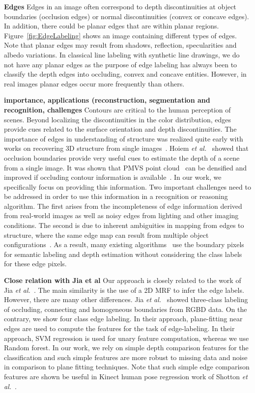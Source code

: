 \textbf{Edges}
Edges in an image often correspond to depth discontinuities at object boundaries (occlusion 
edges) or normal discontinuities (convex or concave edges). In addition, there could be 
planar edges that are within planar regions. Figure~\ref{fig:EdgeLabeling} shows an image 
containing different types of edges. Note that planar edges may result from shadows, reflection, 
specularities and albedo variations. In classical line labeling with synthetic line 
drawings, we do not have any planar edges as the purpose of edge labeling has always been to 
classify the depth edges into occluding, convex and concave entities. However, in real images planar 
edges occur more frequently than others. 

\textbf{importance, applications (reconstruction, segmentation and recognition, challenges}
Contours are critical to the human perception of scenes. Beyond localizing the discontinuities 
in the color distribution, edges provide cues related to the surface orientation and depth 
discontinuities. The importance of edges in understanding of structure was realized quite 
early with works on recovering 3D structure from single 
 images~\cite{malik1989recovering,kanade1981recovery}. Hoiem \textit{et al.}~\cite{hoiem-ROB} showed that occlusion boundaries provide very useful cues to estimate the depth of a scene from a single image. It was shown that PMVS 
point cloud~\cite{furukawa-PAMI10} can be densified and improved if occluding contour information 
is available~\cite{qishan2014Occluding}. In our work, we specifically focus on providing this
information. Two important challenges need to be addressed in order to use this information in a 
recognition or reasoning algorithm. The first arises from the incompleteness of edge information 
derived from real-world images as well as noisy edges from lighting and other imaging conditions. 
The second is due to inherent ambiguities in mapping from edges to structure, where the same 
edge map can result from multiple object configurations~\cite{mild-sugihara}. As a result, many existing 
algorithms~\cite{gcontext-hoiem,hedau2012,schwing2012b,Lifting3DManhattan,lee2010} use the boundary 
pixels for semantic labeling and depth estimation without considering the class labels for these edge pixels. 

\textbf{Close relation with Jia et al}
Our approach is closely related to the work of Jia \textit{et al.}~\cite{depthorder}. The main 
similarity is the use of a 2D MRF to infer the edge labels. However, there are many other 
differences. Jia \textit{et al.}~\cite{depthorder} showed three-class labeling of occluding, connecting and 
homogeneous boundaries from RGBD data. On the contrary, we show four class edge labeling. In their 
approach, plane-fitting near edges are used to compute the features for the task of edge-labeling. 
In their approach, SVM regression is used for unary feature computation, whereas we use Random 
forest. In our work, we rely on simple depth comparison features for the classification and such simple 
features are more robust to missing data and noise in comparison to plane fitting techniques. Note that 
such simple edge comparison features are shown be useful in Kinect human pose regression work of 
Shotton \textit{et al.}~\cite{newcombe2011kinectfusion}.

